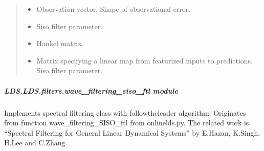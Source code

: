 \documentclass[letterpaper,10pt,english]{sphinxmanual}
\begin{document}
\begin{fulllineitems}
\begin{fulllineitems}
\begin{quote}
\begin{description}
\begin{itemize}
\item {} 
\sphinxAtStartPar
{} \textendash{} Observation vector. Shape of observational error.

\item {} 
\sphinxAtStartPar
{} \textendash{} Siso filter parameter.

\item {} 
\sphinxAtStartPar
{} \textendash{} Hankel matrix.

\item {} 
\sphinxAtStartPar
{} \textendash{} Matrix specifying a linear map from featurized inputs to predictions.
Siso filter parameter.

\end{itemize}

\end{description}\end{quote}

\end{fulllineitems}


\end{fulllineitems}



\subparagraph{LDS.LDS.filters.wave\_filtering\_siso\_ftl module}
\label{\detokenize{LDS.LDS.filters:module-LDS.LDS.filters.wave_filtering_siso_ftl}}\label{\detokenize{LDS.LDS.filters:lds-lds-filters-wave-filtering-siso-ftl-module}}
\sphinxAtStartPar
Implements spectral filtering class with follow\sphinxhyphen{}the\sphinxhyphen{}leader algorithm.
Originates from function wave\_filtering\_SISO\_ftl from onlinelds.py.
The related work is “Spectral Filtering for General Linear Dynamical Systems”
by E.Hazan, K.Singh, H.Lee and C.Zhang.
\end{document}
